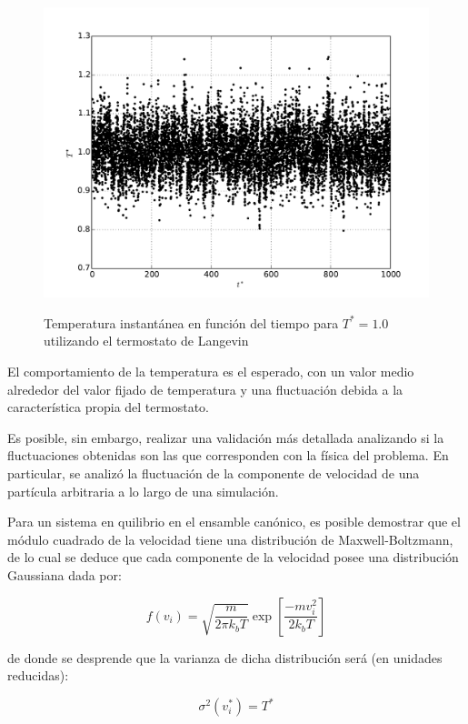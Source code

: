 \documentclass[a4paper,12pt]{article}
\begin{document}
\begin{figure}[H]
	\centering
	\includegraphics[scale=0.5]{termo_tempe.pdf} \\
	\caption{Temperatura instantánea en función del tiempo para $T^*=1.0$ 
	utilizando el termostato de Langevin}\label{fig:termo_tempe}
\end{figure}

El comportamiento de la temperatura es el esperado, con un valor medio 
alrededor del valor fijado de temperatura y una fluctuación debida a la 
característica propia del termostato.

Es posible, sin embargo, realizar una validación más detallada analizando si la 
fluctuaciones obtenidas son las que corresponden con la física del problema. En 
particular, se analizó la fluctuación de la componente de velocidad de una 
partícula arbitraria a lo largo de una simulación.

Para un sistema en quilibrio en el ensamble canónico, es posible demostrar que 
el módulo cuadrado de la velocidad tiene una distribución de Maxwell-Boltzmann, 
de lo cual se deduce que cada componente de la velocidad posee una distribución 
Gaussiana dada por:

\begin{equation}\label{eq:dist_gauss}
f (v_i) =
\sqrt{\frac{m}{2 \pi k_bT}} \exp \left[ \frac{-mv_i^2}{2k_bT} \right]
\end{equation}

\noindent de donde se desprende que la varianza de dicha distribución será (en 
unidades reducidas):

\begin{equation}\label{eq:termo_sigma}
\sigma^2(v^*_i) = T^*
\end{equation}
\end{document}
